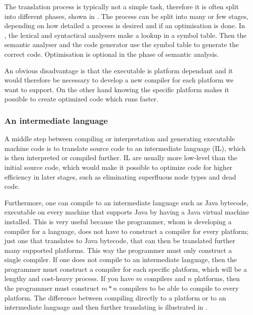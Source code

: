 The translation process is typically not a simple task,
therefore it is often split into different phases, shown in
. The process can be split into many or
few stages, depending on how detailed a process is desired and if an
optimisation is done. In , the lexical and
syntactical analysers make a lookup in a symbol table. Then the semantic
analyser and the code generator use the symbol table to generate
the correct code. Optimisation is optional in the phase of semantic
analysis. \cite[p. 46]{sebesta2013}



An obvious disadvantage is that the executable is platform dependant
and it would therefore be necessary to develop a new compiler for each
platform we want to support. On the other hand knowing the specific
platform makes it possible to create optimized code which runs faster.

\subsubsection{An intermediate language}
\label{sec:intermediatelanguage}
A middle step between compiling or interpretation and generating
executable machine code is to translate source code to an intermediate
language (IL), which is then interpreted or compiled further. IL are
usually more low-level than the initial source code, which would make it
possible to optimize code for higher efficiency in later stages, such as
eliminating superfluous node types and dead code.

Furthermore, one can compile to an intermediate language such as Java
bytecode, executable on every machine that supports
Java by having a Java virtual machine installed. This is very useful
because the programmer, whom is developing a compiler for a language,
does not have to construct a compiler for every platform; just one
that translates to Java bytecode, that can then be translated further many
supported platforms. This way the programmer must only construct a
single compiler. If one does not compile
to an intermediate language, then the programmer must construct a
compiler for each specific platform, which will be a lengthy and
cost-heavy process. If you have $m$ compilers and $n$ platforms, then
the programmer must construct $m*n$ compilers to be able to compile
to every platform. The difference between compiling directly to a
platform or to an intermediate language and then further translating is
illustrated in .

